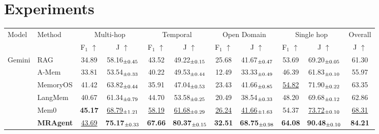 \documentclass{llmxive}
\begin{document}
\section{Experiments}
\begin{table}[t]
\centering
\small
\setlength{\tabcolsep}{6pt}
\begin{tabular}{ll|cc|cc|cc|cc|c}
\toprule
Model & Method
& \multicolumn{2}{c|}{Multi-hop}
& \multicolumn{2}{c|}{Temporal}
& \multicolumn{2}{c|}{Open Domain}
& \multicolumn{2}{c|}{Single hop}
& Overall \\
&
& F$_1$ $\uparrow$ & J $\uparrow$
& F$_1$ $\uparrow$ & J $\uparrow$
& F$_1$ $\uparrow$ & J $\uparrow$
& F$_1$ $\uparrow$ & J $\uparrow$
& J $\uparrow$ \\
\midrule

\multirow{6}{*}{Gemini}
& RAG
& 34.89 & 58.16$_{\scriptsize \pm 0.45}$
& 43.52 & 49.22$_{\scriptsize \pm 0.15}$
& 25.68 & 41.67$_{\scriptsize \pm 0.47}$
& 53.69 & 69.20$_{\scriptsize \pm 0.05}$
& 61.30 \\
& A-Mem
& 33.81 & 53.54$_{\scriptsize \pm 0.33}$
& 40.22 & 49.53$_{\scriptsize \pm 0.44}$
& 12.49 & 33.33$_{\scriptsize \pm 0.49}$
& 46.39 & 61.83$_{\scriptsize \pm 0.10}$
& 55.97 \\
& MemoryOS
& 41.42 & 63.82$_{\scriptsize \pm 0.44}$
& 35.91 & 47.04$_{\scriptsize \pm 0.53}$
& 23.43 & 41.66$_{\scriptsize \pm 0.85}$
& \underline{54.82} & 71.90$_{\scriptsize \pm 0.22}$
& 63.35 \\
& LangMem
& 40.67 & 61.34$_{\scriptsize \pm 0.79}$
& 44.70 & 53.58$_{\scriptsize \pm 0.25}$
& 20.49 & 38.54$_{\scriptsize \pm 0.33}$
& 48.20 & 69.68$_{\scriptsize \pm 0.12}$
& 62.86 \\
& Mem0
& \textbf{45.17} & \underline{68.79$_{\scriptsize \pm 1.21}$}
& \underline{58.19} & \underline{61.68$_{\scriptsize \pm 0.29}$}
& \underline{26.24} & \underline{41.66$_{\scriptsize \pm 1.63}$}
& 54.37 & \underline{73.72$_{\scriptsize \pm 0.10}$}
& \underline{68.31} \\
& \textbf{MRAgent}
& \underline{43.69} & \textbf{75.17$_{\scriptsize \pm 0.33}$}
& \textbf{67.66} & \textbf{80.37$_{\scriptsize \pm 0.15}$}
& \textbf{32.51} & \textbf{68.75$_{\scriptsize \pm 0.98}$}
& \textbf{64.08} & \textbf{90.48$_{\scriptsize \pm 0.10}$}
& \textbf{84.21} \\


\end{tabular}
\end{table}
\end{document}
